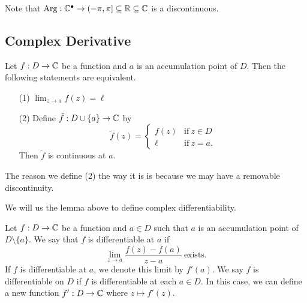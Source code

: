 \documentclass[a4paper]{report}
\begin{document}
Note that \( \operatorname{Arg}: \mathbb{C}^{\bullet} \to (-\pi, \pi] \subseteq  \mathbb{R} \subseteq \mathbb{C}  \) is a discontinuous.

\subsection{Complex Derivative}\label{Derivative}

\begin{lemma}
    Let \( f: D \to \mathbb{C}  \) be a function and \( a \) is an accumulation point of \( D  \). Then the following statements are equivalent.
    \begin{enumerate}
        \item[(1)] \( \lim_{ z \to a } f(z) = \ell  \)
        \item[(2)] Define \( \tilde{f} : D \cup \{ a \} \to \mathbb{C}   \) by
                \[  \tilde{f}(z) = 
                \begin{cases}
                    f(z) &\text{if} \ z \in D \\
                    \ell &\text{if} \ z = a.
                \end{cases} \]
            Then \( \tilde{f} \) is continuous at \( a  \).
    \end{enumerate}
\end{lemma}
The reason we define (2) the way it is is because we may have a removable discontinuity.


We will us the lemma above to define complex differentiability.

\begin{definition}[Differentiability]
    Let \( f: D \to \mathbb{C}  \) be a function and \( a \in D  \) such that \( a \) is an accumulation point of \( D \setminus  \{ a \}  \). We say that \( f  \) is differentiable at \( a  \) if  
    \[  \lim_{ z \to a }  \frac{ f(z) - f(a) }{ z -a  } \ \text{exists}.  \] 
    If \( f  \) is differentiable at \( a \), we denote this limit by \( f'(a) \). We say \( f  \) is differentiable on \( D  \) if \( f  \) is differentiable at each \( a \in D  \). In this case, we can define a new function \( f': D \to \mathbb{C}  \) where \( z \mapsto f'(z) \).
\end{definition}
\end{document}
